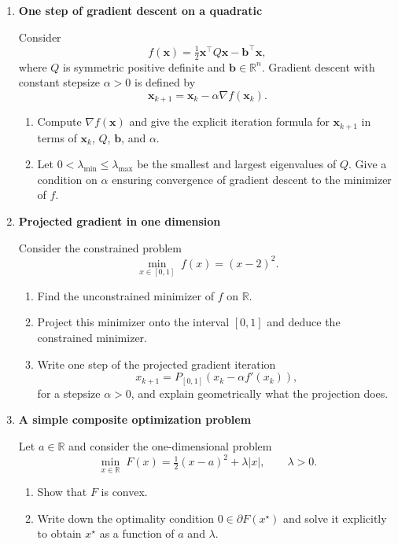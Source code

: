 \documentclass[11pt]{article}
\begin{document}
\begin{enumerate}
\bigskip
\item \textbf{One step of gradient descent on a quadratic}

Consider
\[
f(\bm{x}) = \tfrac{1}{2}\bm{x}^\top Q \bm{x} - \bm{b}^\top \bm{x},
\]
where $Q$ is symmetric positive definite and $\bm{b} \in \mathbb{R}^n$.
Gradient descent with constant stepsize $\alpha>0$ is defined by
\[
\bm{x}_{k+1} = \bm{x}_k - \alpha \nabla f(\bm{x}_k).
\]

\begin{enumerate}
\item Compute $\nabla f(\bm{x})$ and give the explicit iteration formula for $\bm{x}_{k+1}$ in terms of $\bm{x}_k$, $Q$, $\bm{b}$, and $\alpha$.
\item Let $0 < \lambda_{\min} \le \lambda_{\max}$ be the smallest and largest eigenvalues of $Q$.
Give a condition on $\alpha$ ensuring convergence of gradient descent to the minimizer of $f$.
\end{enumerate}

\bigskip
\item \textbf{Projected gradient in one dimension}

Consider the constrained problem
\[
\min_{x\in[0,1]} \; f(x)= (x-2)^2.
\]

\begin{enumerate}
\item Find the unconstrained minimizer of $f$ on $\mathbb{R}$.
\item Project this minimizer onto the interval $[0,1]$ and deduce the constrained minimizer.
\item Write one step of the projected gradient iteration
\[
x_{k+1}=P_{[0,1]}(x_k-\alpha f'(x_k)),
\]
for a stepsize $\alpha>0$, and explain geometrically what the projection does.
\end{enumerate}
\item \textbf{A simple composite optimization problem}

Let $a\in\mathbb{R}$ and consider the one-dimensional problem
\[
\min_{x\in\mathbb{R}} \; F(x) = \tfrac{1}{2}(x-a)^2 + \lambda |x|,\qquad \lambda>0.
\]

\begin{enumerate}
\item Show that $F$ is convex.
\item Write down the optimality condition $0 \in \partial F(x^\star)$ and solve it explicitly to obtain $x^\star$ as a function of $a$ and $\lambda$.
\end{enumerate}


\end{enumerate}
\end{document}
